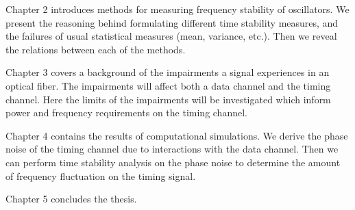 Chapter 2 introduces methods for measuring frequency stability of oscillators. We present the reasoning behind formulating different time stability measures, and the failures of usual statistical measures (mean, variance, etc.). Then we reveal the relations between each of the methods.

Chapter 3 covers a background of the impairments a signal experiences in an optical fiber.  The impairments will affect both a data channel and the timing channel. Here the limits of the impairments will be investigated which inform power and frequency requirements on the timing channel.

Chapter 4 contains the results of computational simulations. We derive the phase noise of the timing channel due to interactions with the data channel. Then we can perform time stability analysis on the phase noise to determine the amount of frequency fluctuation on the timing signal.

Chapter 5 concludes the thesis.


